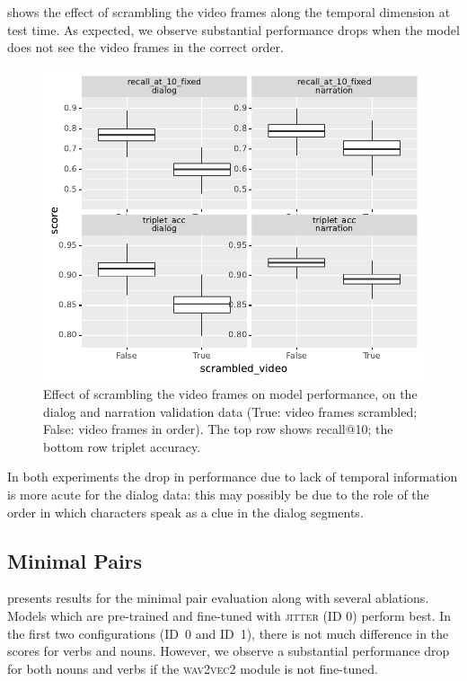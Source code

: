  shows the effect of scrambling the video frames 
along the temporal dimension at test time. As expected, we observe substantial 
performance drops when the model does not see the video frames in 
the correct order. 
\begin{figure}[htb]
	\centering
	\includegraphics[width=\columnwidth]{results/ablations/scrambled_video.pdf}
	\caption{Effect of scrambling the video frames on model performance, on the 
	dialog and narration validation data (True: video frames scrambled;
        False: video frames in order). The top row shows recall@10;
		the bottom row triplet accuracy.}
	\label{fig:scrambled_video}
\end{figure}
In both experiments the drop in performance due to lack of temporal
information is more acute for the dialog data: this may possibly be due to the
role of the order in which characters speak as a clue in the
dialog segments.

\subsection{Minimal Pairs}
\label{sec:minimal-pairs}


 presents results for the minimal pair 
evaluation along with several ablations. Models which are 
pre-trained and fine-tuned with \textsc{jitter} (ID 0) perform best. In the 
first two 
configurations (ID~0 and ID~1), there is not much difference in the scores for 
verbs and nouns. 
However, we observe a substantial performance drop for both nouns and verbs if 
the \textsc{wav2vec2} module is not fine-tuned.

